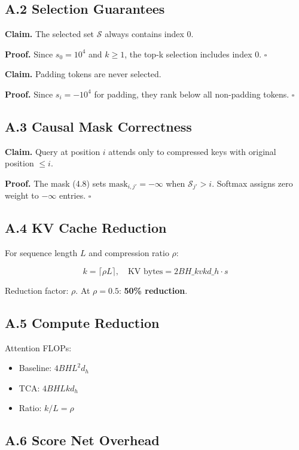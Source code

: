 \subsection{A.2 Selection Guarantees}

\textbf{Claim.} The selected set $\mathcal{S}$ always contains index 0.

\textbf{Proof.} Since $s_0 = 10^4$ and $k \geq 1$, the top-k selection 
includes index 0. $\square$

\textbf{Claim.} Padding tokens are never selected.

\textbf{Proof.} Since $s_i = -10^4$ for padding, they rank below all non-padding 
tokens. $\square$

\subsection{A.3 Causal Mask Correctness}

\textbf{Claim.} Query at position $i$ attends only to compressed keys with 
original position $\leq i$.

\textbf{Proof.} The mask (4.8) sets $\text{mask}_{i,j'} = -\infty$ when 
$\mathcal{S}_{j'} > i$. Softmax assigns zero weight to $-\infty$ entries. 
$\square$

\subsection{A.4 KV Cache Reduction}

For sequence length $L$ and compression ratio $\rho$:

\[
k = \lceil \rho L \rceil, \quad \text{KV bytes} = 2 B H\_{kv} k d\_h \cdot s
\tag{A.2}
\]

Reduction factor: $\rho$. At $\rho = 0.5$: \textbf{50\% reduction}.

\subsection{A.5 Compute Reduction}

Attention FLOPs:
\begin{itemize}
\item Baseline: $4 B H L^2 d_h$
\item TCA: $4 B H L k d_h$
\item Ratio: $k/L = \rho$

\end{itemize}
\subsection{A.6 Score Net Overhead}

